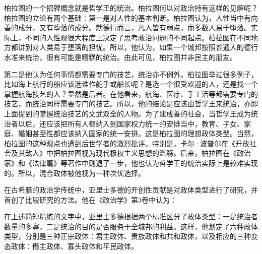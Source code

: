 柏拉图的一个招牌概念就是哲学王的统治。柏拉图何以对政治持有这样的见解呢？柏拉图的立论有两个基础：第一是对人性的基本判断。柏拉图认为，人性当中有向善的成分，又有堕落的成分。就德行而言，凡人皆有弱点，而多数人易于堕落。实际上，不同的人性观很大程度上决定了思考政治问题的不同起点。柏拉图在不同地方都讲到对人类易于堕落的担忧。所以，他认为，如果一个城邦按照普通人的德行水准来统治，很有可能是糟糕的统治。由此可见，柏拉图并非民主的朋友。

第二是他认为任何事情都需要专门的技艺，统治亦不例外。柏拉图举过很多例子，比如海上航行的船应该选谁作舵手或船长呢？是选一个很受欢迎的人，还是找一个掌握航海技艺的人？显然是后者。在他看来，航海、医疗、手工活等都需要专门的技艺，而统治同样需要专门的技艺。所以，他的结论是应该由哲学王来统治，亦即上面提到的掌握统治技艺的文武双全的人物。为了建成善的社会，当哲学王成为统治者以后，还应该把所有人都纳入到国家权力统一的安排当中，教育、子女、家庭、婚姻甚至性都应该纳入国家的统一安排。这是柏拉图的理想政体类型。当然，柏拉图的这种观点也遭到后世学者的激烈批评。特别是，卡尔·波普尔在《开放社会及其敌人》中把柏拉图视为现代极权主义思想的滥觞。后来，柏拉图在《政治家》和《法律篇》等著作中则退了一步，他也认为哲学王的统治实际上是较难实现的。所以，混合政体被他视为一种次优选择。

在古希腊的政治学传统中，亚里士多德的开创性贡献是对政体类型进行了研究，并首创了比较研究的方法。他在《政治学》第3卷中认为：


在上述简短精练的文字中，亚里士多德根据两个标准区分了政体类型：一是统治者数量的多寡，二是统治的目的是否服务于全城邦的利益。这样，他划定了六种政体类型，分别是三种正宗政体：君主政体、贵族政体和共和政体，以及相应的三种变态政体：僭主政体、寡头政体和平民政体。

